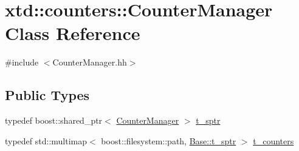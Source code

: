 \hypertarget{classxtd_1_1counters_1_1CounterManager}{}\section{xtd\+:\+:counters\+:\+:Counter\+Manager Class Reference}
\label{classxtd_1_1counters_1_1CounterManager}


{\ttfamily \#include $<$Counter\+Manager.\+hh$>$}

\subsection*{Public Types}
\begin{DoxyCompactItemize}
\item 
typedef boost\+::shared\+\_\+ptr$<$ \hyperlink{classxtd_1_1counters_1_1CounterManager}{Counter\+Manager} $>$ \hyperlink{classxtd_1_1counters_1_1CounterManager_ac136b7de8a55b55a2700d93901ba1e9a}{t\+\_\+sptr}
\item 
typedef std\+::multimap$<$ boost\+::filesystem\+::path, \hyperlink{classxtd_1_1counters_1_1Base_aa0ea634f1a5e3df87418566a3e8fcbd6}{Base\+::t\+\_\+sptr} $>$ \hyperlink{classxtd_1_1counters_1_1CounterManager_ae675635fccfde42cc3831d07adacd2cb}{t\+\_\+counters}
\end{DoxyCompactItemize}

